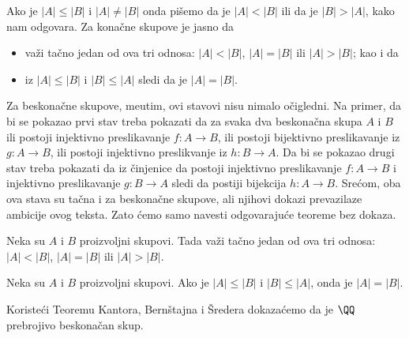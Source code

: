 Ako je $|A| \le |B|$ i $|A| \ne |B|$ onda pi\v semo da je $|A| < |B|$ ili da je $|B| > |A|$, kako nam odgovara.
Za kona\v cne skupove je jasno da
\begin{itemize}
\item
  va\v zi ta\v cno jedan od ova tri odnosa: $|A| < |B|$, $|A| = |B|$ ili $|A| > |B|$; kao i da
\item
  iz $|A| \le |B|$ i $|B| \le |A|$ sledi da je $|A| = |B|$.
\end{itemize}
Za beskona\v cne skupove, me\dj utim, ovi stavovi nisu nimalo o\v cigledni. Na primer,
da bi se pokazao prvi stav treba pokazati da za svaka dva beskona\v cna skupa $A$ i $B$ ili postoji injektivno preslikavanje
$f : A \to B$, ili postoji bijektivno preslikavanje iz $g : A \to B$, ili postoji injektivno preslikvanje iz $h : B \to A$.
Da bi se pokazao drugi stav treba pokazati da iz \v cinjenice
da postoji injektivno preslikavanje $f : A \to B$ i injektivno preslikavanje $g : B \to A$ sledi da postiji
bijekcija $h : A \to B$. Sre\'com, oba ova stava su ta\v cna i za beskona\v cne skupove, ali njihovi dokazi prevazilaze
ambicije ovog teksta. Zato \'cemo samo navesti odgovaraju\'ce teoreme bez dokaza.

\begin{THM}[Trihotomija]
  Neka su $A$ i $B$ proizvoljni skupovi. Tada va\v zi ta\v cno jedan od ova tri odnosa: $|A| < |B|$, $|A| = |B|$ ili $|A| > |B|$.
\end{THM}

\begin{THM}
  Neka su $A$ i $B$ proizvoljni skupovi. Ako je $|A| \le |B|$ i $|B| \le |A|$, onda je $|A| = |B|$.
\end{THM}

Koriste\'ci Teoremu Kantora, Bern\v stajna i \v Sredera dokaza\'cemo da je $\QQ$ prebrojivo beskona\v can skup.

